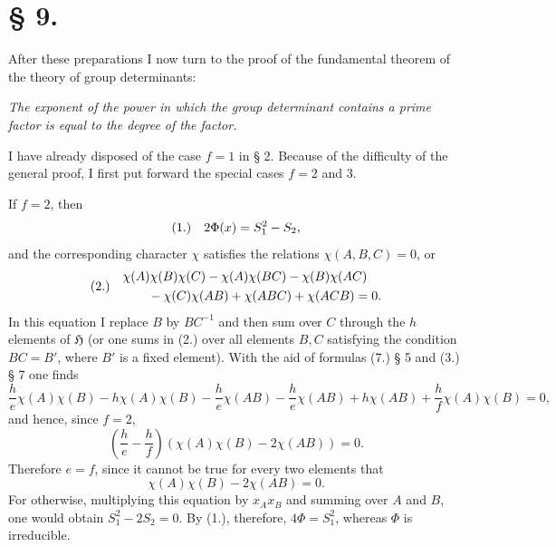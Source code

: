 \documentclass[11pt]{article}
\makeatletter
\newcommand{\Hgrp}{\mathfrak{H}}
\newcommand{\frobtagc}[2]{\[\begin{array}{@{}r@{\quad}c@{}}\textup{(#1)} & \displaystyle #2\end{array}\]}
\makeatother
\begin{document}
\section*{§ 9.}

After these preparations I now turn to the proof of the fundamental theorem of the theory of group determinants:

\emph{The exponent of the power in which the group determinant contains a prime factor is equal to the degree of the factor.}

I have already disposed of the case $f=1$ in § 2. Because of the difficulty of the general proof, I first put forward the special cases $f=2$ and 3.

If $f=2$, then
\frobtagc{1.}{2\Phi(x)=S_1^2-S_2,}
and the corresponding character $\chi$ satisfies the relations $\chi(A,B,C)=0$, or
\frobtagc{2.}{\begin{aligned}
&\chi(A)\chi(B)\chi(C)-\chi(A)\chi(BC)-\chi(B)\chi(AC)\nobreak\\
&\qquad{}-\chi(C)\chi(AB)+\chi(ABC)+\chi(ACB)=0.
\end{aligned}}
In this equation I replace $B$ by $BC^{-1}$ and then sum over $C$ through the $h$ elements of $\Hgrp$ (or one sums in (2.) over all elements $B,C$ satisfying the condition $BC=B'$, where $B'$ is a fixed element). With the aid of formulas (7.) § 5 and (3.) § 7 one finds
\[
\frac{h}{e}\chi(A)\chi(B)-h\chi(A)\chi(B)-\frac{h}{e}\chi(AB)-\frac{h}{e}\chi(AB)+h\chi(AB)+\frac{h}{f}\chi(A)\chi(B)=0,
\]
and hence, since $f=2$,
\[
\left(\frac{h}{e}-\frac{h}{f}\right)(\chi(A)\chi(B)-2\chi(AB))=0.
\]
Therefore $e=f$, since it cannot be true for every two elements that
\[
\chi(A)\chi(B)-2\chi(AB)=0.
\]
For otherwise, multiplying this equation by $x_Ax_B$ and summing over $A$ and $B$, one would obtain $S_1^2-2S_2=0$. By (1.), therefore, $4\Phi=S_1^2$, whereas $\Phi$ is irreducible.
\end{document}
